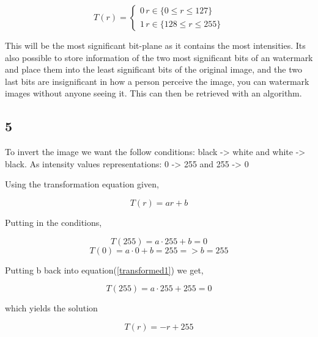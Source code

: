 {    \begin{equation}
        T(r) =  \begin{cases} 
            0 \, r\in\{0\leq r \leq 127 \} \\
            1 \, r\in\{128\leq r \leq 255 \}
         \end{cases}
    \end{equation}
    
    This will be the most significant bit-plane as it contains the most intensities. Its also possible to store information of the two most significant bits of an watermark and place them into the least significant bits of the original image, and the two last bits are insignificant in how a person perceive the image, you can watermark images without anyone seeing it. This can then be retrieved with an algorithm.
    
    
    \subsection{5}
    
    To invert the image we want the follow conditions: black -> white and white -> black.
    As intensity values representations: 0 -> 255 and 255 -> 0
    
    Using the transformation equation given,
    
    \begin{equation*}
        T(r) = ar + b
    \end{equation*}
    
    Putting in the conditions,
    
    \begin{equation}
        T(255) = a\cdot 255 + b = 0
        \label{transformed1}
    \end{equation}
    \begin{equation*}
        T(0) = a\cdot 0 + b = 255 => b = 255
    \end{equation*}
    
    Putting b back into equation(\ref{transformed1}) we get,
    
    \begin{equation*}
        T(255) = a\cdot 255 + 255 = 0
    \end{equation*}
    
    which yields the solution
    
    \begin{equation}
        T(r) = -r + 255
    \end{equation}





}

